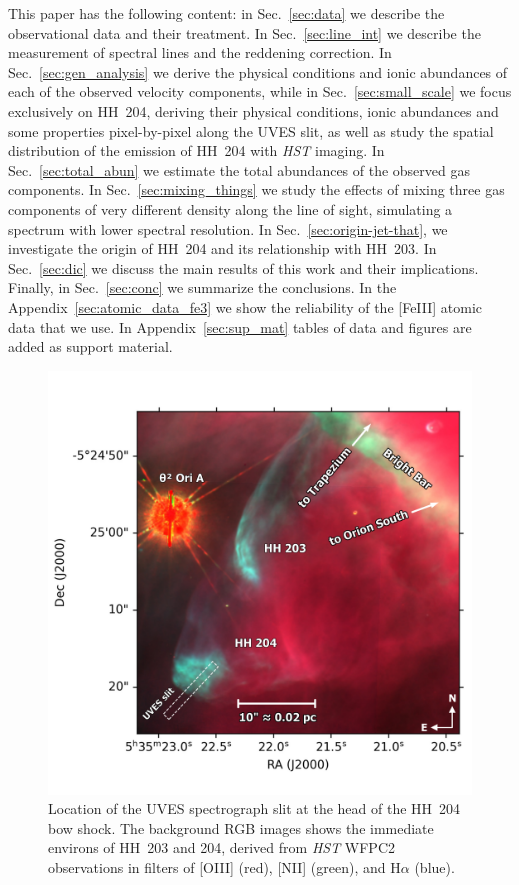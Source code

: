 \documentclass[twocolumn,linenumbers]{aastex63}
\begin{document}
%
This paper has the following content: in Sec.~\ref{sec:data} we describe the observational data and their  treatment. In Sec.~\ref{sec:line_int} we describe the measurement of spectral lines and the reddening correction. In Sec.~\ref{sec:gen_analysis} we derive the physical conditions and  ionic abundances of each of the observed velocity components, while in Sec.~\ref{sec:small_scale} we focus exclusively on HH~204, deriving their physical conditions, ionic abundances and some properties pixel-by-pixel along the UVES slit, as well as study the spatial distribution of the emission of HH~204 with \textit{HST} imaging. In Sec.~\ref{sec:total_abun} we estimate the total abundances of the observed gas components. In Sec.~\ref{sec:mixing_things} we study the effects of mixing three gas components of very different density along the line of sight, simulating a spectrum with lower spectral resolution. In Sec.~\ref{sec:origin-jet-that}, we investigate the origin of HH~204 and its relationship with HH~203. In Sec.~\ref{sec:dic} we discuss the main results of this work and their implications. Finally, in Sec.~\ref{sec:conc} we summarize the conclusions. In the Appendix~\ref{sec:atomic_data_fe3} we show the reliability of the [Fe\thinspace III] atomic data that we use. In Appendix~\ref{sec:sup_mat} tables of data and figures are added as support material.


\begin{figure}
\centering
\includegraphics[width=\linewidth]{hh204-finding-chart-simple}
\caption{ Location of the UVES spectrograph slit at the head of the HH~204 bow shock. The background RGB images shows the immediate environs of HH~203 and 204, derived from \textit{HST} WFPC2 observations \citep{ODell:1996a} in filters of [O\thinspace III] (red), [N\thinspace II] (green), and H$\alpha$ (blue).}
\label{fig:hh204-finding-chart-simple}
\end{figure}
\end{document}
